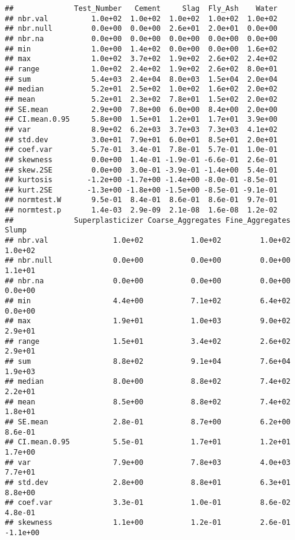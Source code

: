 \documentclass[]{article}
\begin{document}
\begin{verbatim}
##              Test_Number   Cement     Slag  Fly_Ash    Water
## nbr.val          1.0e+02  1.0e+02  1.0e+02  1.0e+02  1.0e+02
## nbr.null         0.0e+00  0.0e+00  2.6e+01  2.0e+01  0.0e+00
## nbr.na           0.0e+00  0.0e+00  0.0e+00  0.0e+00  0.0e+00
## min              1.0e+00  1.4e+02  0.0e+00  0.0e+00  1.6e+02
## max              1.0e+02  3.7e+02  1.9e+02  2.6e+02  2.4e+02
## range            1.0e+02  2.4e+02  1.9e+02  2.6e+02  8.0e+01
## sum              5.4e+03  2.4e+04  8.0e+03  1.5e+04  2.0e+04
## median           5.2e+01  2.5e+02  1.0e+02  1.6e+02  2.0e+02
## mean             5.2e+01  2.3e+02  7.8e+01  1.5e+02  2.0e+02
## SE.mean          2.9e+00  7.8e+00  6.0e+00  8.4e+00  2.0e+00
## CI.mean.0.95     5.8e+00  1.5e+01  1.2e+01  1.7e+01  3.9e+00
## var              8.9e+02  6.2e+03  3.7e+03  7.3e+03  4.1e+02
## std.dev          3.0e+01  7.9e+01  6.0e+01  8.5e+01  2.0e+01
## coef.var         5.7e-01  3.4e-01  7.8e-01  5.7e-01  1.0e-01
## skewness         0.0e+00  1.4e-01 -1.9e-01 -6.6e-01  2.6e-01
## skew.2SE         0.0e+00  3.0e-01 -3.9e-01 -1.4e+00  5.4e-01
## kurtosis        -1.2e+00 -1.7e+00 -1.4e+00 -8.0e-01 -8.5e-01
## kurt.2SE        -1.3e+00 -1.8e+00 -1.5e+00 -8.5e-01 -9.1e-01
## normtest.W       9.5e-01  8.4e-01  8.6e-01  8.6e-01  9.7e-01
## normtest.p       1.4e-03  2.9e-09  2.1e-08  1.6e-08  1.2e-02
##              Superplasticizer Coarse_Aggregates Fine_Aggregates    Slump
## nbr.val               1.0e+02           1.0e+02         1.0e+02  1.0e+02
## nbr.null              0.0e+00           0.0e+00         0.0e+00  1.1e+01
## nbr.na                0.0e+00           0.0e+00         0.0e+00  0.0e+00
## min                   4.4e+00           7.1e+02         6.4e+02  0.0e+00
## max                   1.9e+01           1.0e+03         9.0e+02  2.9e+01
## range                 1.5e+01           3.4e+02         2.6e+02  2.9e+01
## sum                   8.8e+02           9.1e+04         7.6e+04  1.9e+03
## median                8.0e+00           8.8e+02         7.4e+02  2.2e+01
## mean                  8.5e+00           8.8e+02         7.4e+02  1.8e+01
## SE.mean               2.8e-01           8.7e+00         6.2e+00  8.6e-01
## CI.mean.0.95          5.5e-01           1.7e+01         1.2e+01  1.7e+00
## var                   7.9e+00           7.8e+03         4.0e+03  7.7e+01
## std.dev               2.8e+00           8.8e+01         6.3e+01  8.8e+00
## coef.var              3.3e-01           1.0e-01         8.6e-02  4.8e-01
## skewness              1.1e+00           1.2e-01         2.6e-01 -1.1e+00

\end{verbatim}
\end{document}

